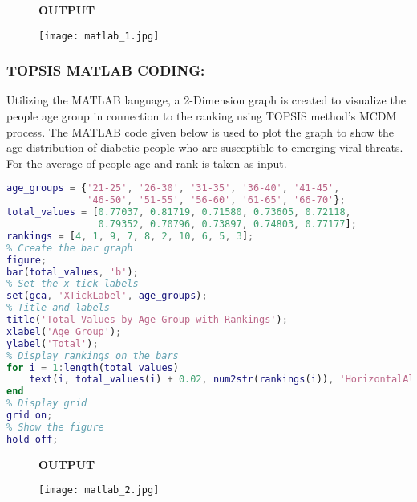 \documentclass[12pt,a4paper]{article}
\begin{document}
\begin{figure}
\begin{center}
    \textbf{OUTPUT}
\end{center}
    \centering
\texttt{[image: matlab\_1.jpg]}
\end{figure}
\newpage
\subsubsection{TOPSIS MATLAB CODING:}
\hspace{1em}Utilizing the MATLAB language, a 2-Dimension graph is created to visualize the people age group in connection to the ranking using TOPSIS method’s MCDM process. The MATLAB code given below is used to plot the graph to show the age distribution of diabetic people who are susceptible to emerging viral threats. For the average of people age and rank is taken as input. \\
\begin{lstlisting}[language= MATLAB]
% Data
age_groups = {'21-25', '26-30', '31-35', '36-40', '41-45',
              '46-50', '51-55', '56-60', '61-65', '66-70'};
total_values = [0.77037, 0.81719, 0.71580, 0.73605, 0.72118, 
                0.79352, 0.70796, 0.73897, 0.74803, 0.77177];
rankings = [4, 1, 9, 7, 8, 2, 10, 6, 5, 3];
% Create the bar graph
figure;
bar(total_values, 'b');
% Set the x-tick labels
set(gca, 'XTickLabel', age_groups);
% Title and labels
title('Total Values by Age Group with Rankings');
xlabel('Age Group');
ylabel('Total');
% Display rankings on the bars
for i = 1:length(total_values)
    text(i, total_values(i) + 0.02, num2str(rankings(i)), 'HorizontalAlignment', 'center');
end
% Display grid
grid on;
% Show the figure
hold off;

\end{lstlisting}
\begin{figure}
\begin{center}
    \textbf{OUTPUT}
\end{center}
    \centering
\texttt{[image: matlab\_2.jpg]}
\end{figure}
\end{document}
